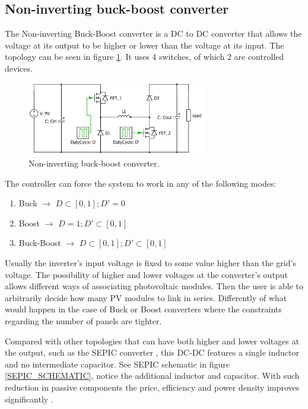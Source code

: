 
\subsection{Non-inverting buck-boost converter\label{N_INV_BB}}
		
The Non-inverting Buck-Boost converter is a DC to DC converter that allows the voltage at its output to be higher or lower than the voltage at its input. The topology can be seen in figure \ref{N_INV_BB_SCHEMATIC}. It uses 4 switches, of which 2 are controlled devices. 
		

\begin{figure}[htbp]
	\begin{center}
	\includegraphics[width=0.7\textwidth]{../Pictures/2_d_H_B_BB}
	\caption{Non-inverting buck-boost converter.}
	\label{N_INV_BB_SCHEMATIC}
	\end{center}	
\end{figure}

		
The controller can force the system to work in any of the following modes:

\begin{enumerate}
	\item Buck $\rightarrow$ $ D \subset [0,1];	 D' = 0 $
	\item Boost $\rightarrow$ $ D = 1;	 D' \subset [0,1] $
	\item Buck-Boost $\rightarrow$ $ D \subset [0,1]; D' \subset [0,1] $
\end{enumerate}
		
Usually the inverter's input voltage is fixed to some value higher than the grid's voltage. The possibility of higher and lower voltages at the converter's output allows different ways of associating photovoltaic modules. Then the user is able to arbitrarily decide how many PV modules to link in series. Differently of what would happen in the case of Buck or Boost converters where the constraints regarding the number of panels are tighter.
		
Compared with other topologies that can have both higher and lower voltages at the output, such as the SEPIC converter , this DC-DC features a single inductor and no intermediate capacitor. See SEPIC schematic in figure \ref{SEPIC_SCHEMATIC}, notice the additional inductor and capacitor. With such reduction in passive components the price, efficiency and power density improves significantly \cite{underthehood}.

